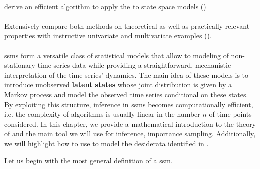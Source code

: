 \begin{tcolorbox}[title={Contributions}]
    \paragraph{}
    derive an efficient algorithm to apply the \acem to state space models ()

    \paragraph{}

    \paragraph{} Extensively compare both methods on theoretical as well as practically relevant properties with instructive univariate and multivariate examples (). 

    \paragraph{}
\end{tcolorbox}
\newpage

\Glspl{ssm} form a versatile class of statistical models that allow to modeling of non-stationary time series data while providing a straightforward, mechanistic interpretation of the time series' dynamics.
The main idea of these models is to introduce unobserved \textbf{latent states} whose joint distribution is given by a Markov process and model the observed time series conditional on these states.
By exploiting this structure, inference in \glspl{ssm} becomes computationally efficient, i.e. the complexity of algorithms is usually linear in the number $n$ of time points considered. 
In this chapter, we provide a mathematical introduction to the theory of  and the main tool we will use for inference, importance sampling. 
Additionally, we will highlight how to use  to model the desiderata identified in . 

Let us begin with the most general definition of a \acrshort{ssm}. 

